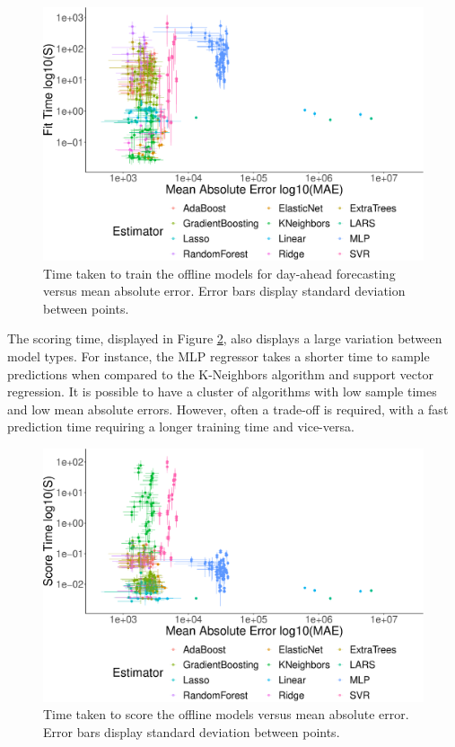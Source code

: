 \begin{figure}[H]
	\centering
	\includegraphics[width=0.65\columnwidth]{Chapter5/figures/market-forecasting/results/offline_fit_time_vs_mae_all_results_opaque.eps}
	\caption{Time taken to train the offline models for day-ahead forecasting versus mean absolute error. Error bars display standard deviation between points.}
	\label{fig:offline_fit_time_vs_mae}
\end{figure}


The scoring time, displayed in Figure \ref{fig:offline_score_time_vs_mae}, also displays a large variation between model types. For instance, the MLP regressor takes a shorter time to sample predictions when compared to the K-Neighbors algorithm and support vector regression. It is possible to have a cluster of algorithms with low sample times and low mean absolute errors. However, often a trade-off is required, with a fast prediction time requiring a longer training time and vice-versa. 



\begin{figure}
	\centering
	\includegraphics[width=0.65\columnwidth]{Chapter5/figures/market-forecasting/results/offline_score_time_vs_mae_all_results_opaque.eps}
	\caption{Time taken to score the offline models versus mean absolute error. Error bars display standard deviation between points.}
	\label{fig:offline_score_time_vs_mae}
\end{figure}









